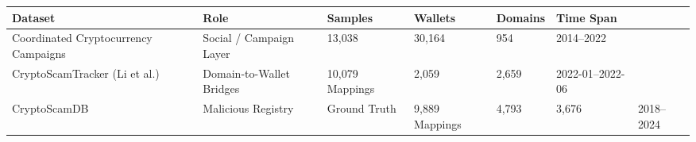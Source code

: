\begin{tabular}{llllll}
\toprule
Dataset & Role & Samples & Wallets & Domains & Time Span \\
\midrule
Coordinated Cryptocurrency Campaigns & Social / Campaign Layer & 13,038 & 30,164 & 954 & 2014--2022 \\
CryptoScamTracker (Li et al.) & Domain-to-Wallet Bridges & 10,079 Mappings & 2,059 & 2,659 & 2022-01--2022-06 \\
CryptoScamDB & Malicious Registry & Ground Truth & 9,889 Mappings & 4,793 & 3,676 & 2018--2024 \\
\bottomrule
\end{tabular}
